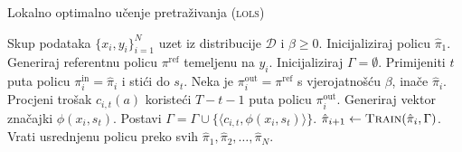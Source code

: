 \begin{algorithm}
\caption{Lokalno optimalno učenje pretraživanja (\textsc{lols})}\label{lolsalg}
\begin{algorithmic}[1]
\Require Skup podataka $\{x_i, y_i\}_{i=1}^N$ uzet iz distribucije $\mathcal{D}$
         i $\beta \geq 0$. %
\State Inicijaliziraj policu $\hat{\pi}_1$.
  \State Generiraj referentnu policu $\pi^{\text{ref}}$ temeljenu na $y_i$.
  \State Inicijaliziraj $\Gamma = \emptyset$. 
    \State Primijeniti $t$ puta policu $\pi_{i}^{\text{in}} = \hat{\pi}_i$  i stići do $s_t$. 
      \State Neka je  $\pi_{i}^{\text{out}} = \pi^{\text{ref}}$ s vjerojatnošću $\beta$, inače $\hat{\pi}_i$.
      \State Procjeni trošak $c_{i,t}(a)$ koristeći $T-t-1$ puta policu $\pi_{i}^{\text{out}}$. 
    \EndFor
    \State Generiraj vektor značajki $\phi(x_i, s_t)$.
    \State Postavi $\Gamma = \Gamma \cup \{\langle c_{i,t}, \phi(x_i, s_t) \rangle\}$.
  \EndFor
  \State $\hat{\pi}_{i+1} \gets \textsc{Train}(\hat{\pi}_i, \Gamma)$.
\EndFor
\State Vrati usrednjenu policu preko svih $\hat{\pi}_1, \hat{\pi}_2, \ldots, \hat{\pi}_N$.
\end{algorithmic}
\end{algorithm}
